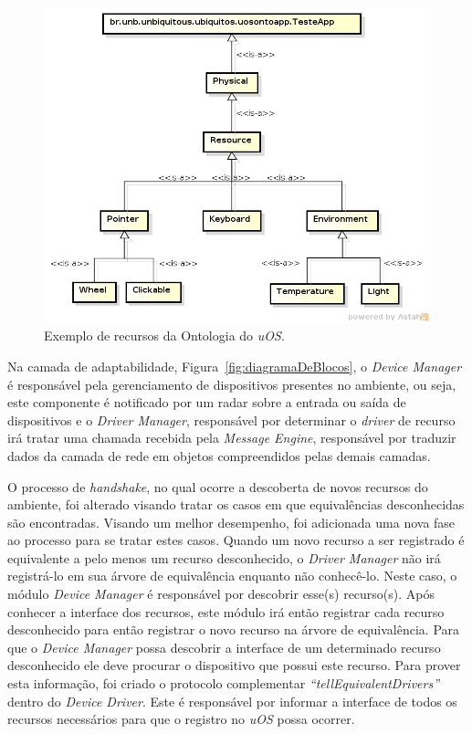 \begin{figure}[ht]
	\center
	\includegraphics[scale=0.7]{imagens/ontologia}
	\caption{Exemplo de recursos da Ontologia do \emph{uOS}.}
	\label{fig:ontologiaUOS}
\end{figure}

Na camada de adaptabilidade, Figura~\ref{fig:diagramaDeBlocos}, o \emph{Device Manager} é responsável pela gerenciamento de dispositivos presentes no ambiente, ou seja, este componente é notificado por um radar sobre a entrada ou saída de dispositivos e o \emph{Driver Manager}, responsável por determinar o \emph{driver} de recurso irá tratar uma chamada recebida pela \emph{Message Engine}, responsável por traduzir dados da camada de rede em objetos compreendidos pelas demais camadas.

O processo de \emph{handshake}, no qual ocorre a descoberta de novos recursos do ambiente, foi alterado visando tratar os casos em que equivalências desconhecidas são encontradas. Visando um melhor desempenho, foi adicionada uma nova fase ao processo para se tratar estes casos. Quando um novo recurso a ser registrado é equivalente a pelo menos um recurso desconhecido, o \emph{Driver Manager} não irá registrá-lo em sua árvore de equivalência enquanto não conhecê-lo. Neste caso, o módulo \emph{Device Manager} é responsável por descobrir esse(s) recurso(s). Após conhecer a interface dos recursos, este módulo irá então registrar cada recurso desconhecido para então registrar o novo recurso na árvore de equivalência. Para que o \emph{Device Manager} possa descobrir a interface de um determinado recurso desconhecido ele deve procurar o dispositivo que possui este recurso. Para prover esta informação, foi criado o protocolo complementar \emph{``tellEquivalentDrivers''} dentro do \emph{Device Driver}. Este é responsável por informar a interface de todos os recursos necessários para que o registro no \emph{uOS} possa ocorrer.
